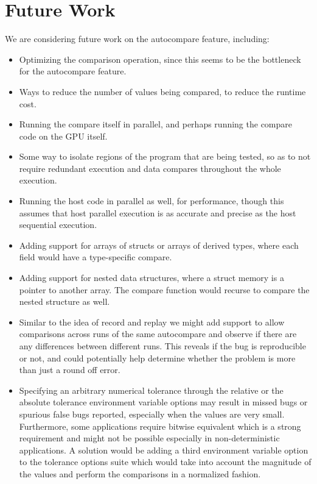 \section{Future Work}

We are considering future work on the autocompare feature, including:
\begin{itemize}
\item Optimizing the comparison operation, since this seems to be the bottleneck for the autocompare feature.
\item Ways to reduce the number of values being compared, to reduce the runtime cost.
\item Running the compare itself in parallel, and perhaps running the compare code on the GPU itself.
\item Some way to isolate regions of the program that are being tested, so as to not require redundant execution and data compares throughout the whole execution.
\item Running the host code in parallel as well, for performance, though this assumes that host parallel execution is as accurate and precise as the host sequential execution.
\item Adding support for arrays of structs or arrays of derived types, where each field would have a type-specific compare.
\item Adding support for nested data structures, where a struct memory is a pointer to another array.
The compare function would recurse to compare the nested structure as well.
\item Similar to the idea of record and replay \cite{sato2015clock} we might add support to allow comparisons across runs of the same autocompare and observe if there are any differences between different runs. This reveals if the bug is reproducible or not, and could potentially help determine whether the problem is more than just a round off error. 
\item Specifying an arbitrary numerical tolerance through the relative or the absolute tolerance environment variable options may result in missed bugs or spurious false bugs reported, especially when the values are very small. Furthermore, some applications require bitwise equivalent which is a strong requirement and might not be possible especially in non-deterministic applications. A solution would be adding a third environment variable option to the tolerance options suite which would take into account the magnitude of the values and perform the comparisons in a normalized fashion. 
\end{itemize}

